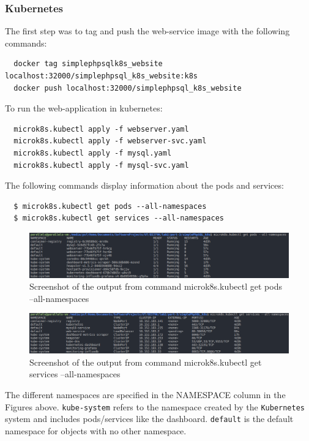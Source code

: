 \documentclass[11pt]{article}
\begin{document}
\subsubsection*{Kubernetes}
The first step was to tag and push the web-service image with the following commands:
\begin{verbatim}
  docker tag simplephpsqlk8s_website localhost:32000/simplephpsql_k8s_website:k8s
  docker push localhost:32000/simplephpsql_k8s_website
\end{verbatim}
To run the web-application in kubernetes:
\begin{verbatim}
  microk8s.kubectl apply -f webserver.yaml
  microk8s.kubectl apply -f webserver-svc.yaml
  microk8s.kubectl apply -f mysql.yaml
  microk8s.kubectl apply -f mysql-svc.yaml
\end{verbatim}
The following commands display information about the pods and services:
\begin{verbatim}
  $ microk8s.kubectl get pods --all-namespaces
  $ microk8s.kubectl get services --all-namespaces
\end{verbatim}
\begin{figure}[htbp]
  \centering
  \includegraphics[width=.9\linewidth]{./pods.png}
  \caption{\label{fig:pods}
    Screenshot of the output from command microk8s.kubectl get pods --all-namespaces}
\end{figure}
\begin{figure}[htbp]
  \centering
  \includegraphics[width=.9\linewidth]{./services.png}
  \caption{\label{fig:services}
    Screenshot of the output from command microk8s.kubectl get services --all-namespaces}
\end{figure}

The different namespaces are specified in the NAMESPACE column in the Figures above.
\verb|kube-system| refers to the namespace created by the \verb|Kubernetes| system and includes pods/services like the dashboard.
\verb|default| is the default namespace for objects with no other namespace.~\cite{namespaces}
\end{document}
